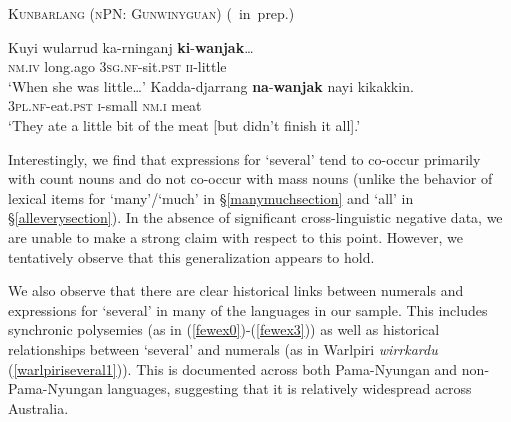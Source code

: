 \documentclass[12pt,egregdoesnotlikesansseriftitles]{scrartcl}
\begin{document}
\begin{exe}
  \ex\label{ex:lil} \textsc{Kunbarlang (nPN: Gunwinyguan)} \hfill (\citealt{ikthesis}~in~prep.)
  \begin{xlist}
    \ex \gll Kuyi wularrud ka-rninganj \textbf{ki}-\textbf{wanjak}\ldots\\
    \textsc{nm.iv} long.ago \textsc{3sg.nf}-sit.\textsc{pst} \textsc{ii}-little\\
    \glt `When she was little\ldots' %
    \ex \gll Kadda-djarrang \textbf{na}-\textbf{wanjak} nayi kikakkin.\\
    \textsc{3pl.nf}-eat.\textsc{pst} \textsc{i}-small \textsc{nm.i} meat\\
    \glt `They ate a little bit of the meat [but didn't finish it all].' %
  \end{xlist}
\end{exe}

Interestingly, we find that expressions for `several' tend to co-occur primarily with count nouns and do not co-occur with mass nouns (unlike the behavior of lexical items for `many'/`much' in \S\ref{manymuchsection} and `all' in \S\ref{alleverysection}). In the absence of significant cross-linguistic negative data, we are unable to make a strong claim with respect to this point. However, we tentatively observe that this generalization appears to hold.


We also observe that there are clear historical links between numerals and expressions for `several' in many of the languages in our sample. This includes synchronic polysemies (as in (\ref{fewex0})-(\ref{fewex3})) as well as historical relationships between `several' and numerals (as in Warlpiri \textit{wirrkardu} (\ref{warlpiriseveral1})). This is documented across both Pama-Nyungan and non-Pama-Nyungan languages, suggesting that it is relatively widespread across Australia.
\end{document}
